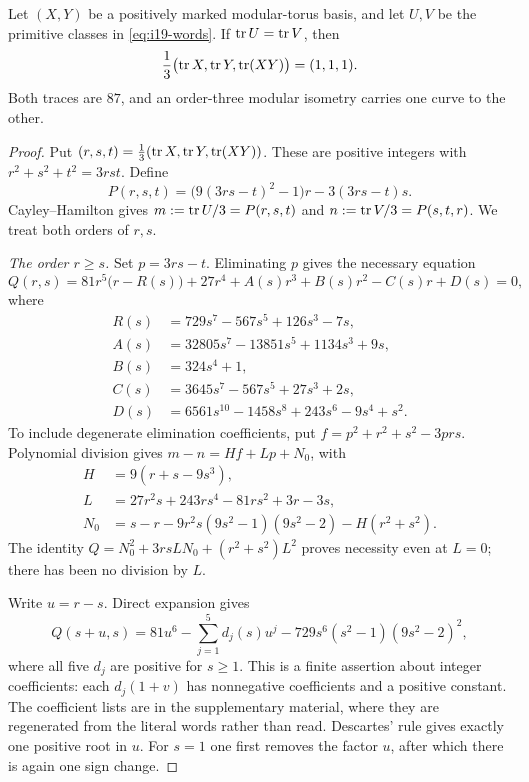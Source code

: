 \begin{proposition}
\label{prop:intersection-nineteen}
Let $(X,Y)$ be a positively marked modular-torus basis, and let $U,V$ be the primitive classes in \eqref{eq:i19-words}. If $\operatorname{tr} U=\operatorname{tr} V$, then
$$
 \frac13\bigl(\operatorname{tr} X,\operatorname{tr} Y,\operatorname{tr}(XY)\bigr)=(1,1,1).
$$
Both traces are $87$, and an order-three modular isometry carries one curve to the other.
\end{proposition}

\begin{proof}
Put $(r,s,t)=\frac13(\operatorname{tr} X,\operatorname{tr} Y,\operatorname{tr}(XY))$. These are positive integers with $r^2+s^2+t^2=3rst$. Define
\begin{equation}
 P(r,s,t)=\bigl(9(3rs-t)^2-1\bigr)r-3(3rs-t)s.
 \label{eq:i19-P}
\end{equation}
Cayley--Hamilton gives $m:=\operatorname{tr} U/3=P(r,s,t)$ and $n:=\operatorname{tr} V/3=P(s,t,r)$. We treat both orders of $r,s$.

\smallskip\noindent\emph{The order $r\geqslant s$.}
Set $p=3rs-t$. Eliminating $p$ gives the necessary equation
\begin{equation}
 Q(r,s)=81r^5\bigl(r-R(s)\bigr)+27r^4+A(s)r^3+B(s)r^2-C(s)r+D(s)=0,
 \label{eq:i19-Q}
\end{equation}
where
\begin{align*}
 R(s)&=729s^7-567s^5+126s^3-7s,\\
 A(s)&=32805s^7-13851s^5+1134s^3+9s,\\
 B(s)&=324s^4+1,\\
 C(s)&=3645s^7-567s^5+27s^3+2s,\\
 D(s)&=6561s^{10}-1458s^8+243s^6-9s^4+s^2.
\end{align*}
To include degenerate elimination coefficients, put $f=p^2+r^2+s^2-3prs$. Polynomial division gives $m-n=Hf+Lp+N_0$, with
\begin{align*}
 H&=9(r+s-9s^3),\\
 L&=27r^2s+243rs^4-81rs^2+3r-3s,\\
 N_0&=s-r-9r^2s(9s^2-1)(9s^2-2)-H(r^2+s^2).
\end{align*}
The identity $Q=N_0^2+3rsLN_0+(r^2+s^2)L^2$ proves necessity even at $L=0$; there has been no division by $L$.

Write $u=r-s$. Direct expansion gives
\begin{equation}
 Q(s+u,s)=81u^6-\sum_{j=1}^5d_j(s)u^j
 -729s^6(s^2-1)(9s^2-2)^2,
 \label{eq:i19-descartes}
\end{equation}
where all five $d_j$ are positive for $s\geqslant1$. This is a finite assertion about integer coefficients: each $d_j(1+v)$ has nonnegative coefficients and a positive constant. The coefficient lists are in the supplementary material, where they are regenerated from the literal words rather than read. Descartes' rule gives exactly one positive root in $u$. For $s=1$ one first removes the factor $u$, after which there is again one sign change.


\end{proof}
